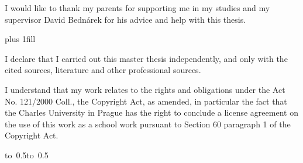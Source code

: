 \documentclass[12pt,a4paper]{report}
\let\openright=\clearpage
\begin{document}
\newpage



\openright

\noindent
I would like to thank my parents for supporting me in my studies and my supervisor David Bednárek for his advice and help with this thesis.

\newpage


\vglue 0pt plus 1fill

\noindent
I declare that I carried out this master thesis independently, and only with the cited
sources, literature and other professional sources.

\medskip\noindent
I understand that my work relates to the rights and obligations under the Act No.
121/2000 Coll., the Copyright Act, as amended, in particular the fact that the Charles
University in Prague has the right to conclude a license agreement on the use of this
work as a school work pursuant to Section 60 paragraph 1 of the Copyright Act.

\vspace{10mm}

\hbox{\hbox to 0.5\hbox to 0.5}

\vspace{20mm}
\newpage

\end{document}
